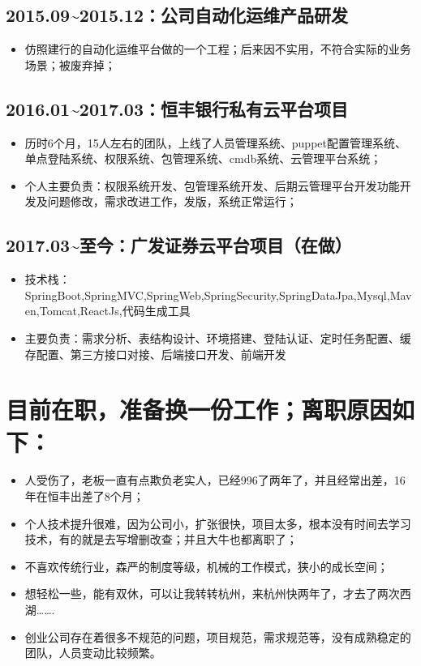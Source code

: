 \documentclass[11pt]{article}
\begin{document}
\subsection*{2015.09\textasciitilde{}2015.12：公司自动化运维产品研发}
\label{sec:orgheadline9}
\begin{itemize}
\item 仿照建行的自动化运维平台做的一个工程；后来因不实用，不符合实际的业务场景；被废弃掉；
\end{itemize}
\subsection*{2016.01\textasciitilde{}2017.03：恒丰银行私有云平台项目}
\label{sec:orgheadline10}
\begin{itemize}
\item 历时6个月，15人左右的团队，上线了人员管理系统、puppet配置管理系统、单点登陆系统、权限系统、包管理系统、cmdb系统、云管理平台系统；
\item 个人主要负责：权限系统开发、包管理系统开发、后期云管理平台开发功能开发及问题修改，需求改进工作，发版，系统正常运行；
\end{itemize}
\subsection*{2017.03\textasciitilde{}至今：广发证券云平台项目（在做）}
\label{sec:orgheadline11}
\begin{itemize}
\item 技术栈：SpringBoot,SpringMVC,SpringWeb,SpringSecurity,SpringDataJpa,Mysql,Maven,Tomcat,ReactJs,代码生成工具
\item 主要负责：需求分析、表结构设计、环境搭建、登陆认证、定时任务配置、缓存配置、第三方接口对接、后端接口开发、前端开发
\end{itemize}

\section*{目前在职，准备换一份工作；离职原因如下：}
\label{sec:orgheadline13}
\begin{itemize}
\item 人受伤了，老板一直有点欺负老实人，已经996了两年了，并且经常出差，16年在恒丰出差了8个月；
\item 个人技术提升很难，因为公司小，扩张很快，项目太多，根本没有时间去学习技术，有的就是去写增删改查；并且大牛也都离职了；
\item 不喜欢传统行业，森严的制度等级，机械的工作模式，狭小的成长空间；
\item 想轻松一些，能有双休，可以让我转转杭州，来杭州快两年了，才去了两次西湖\ldots{}\ldots{}.
\item 创业公司存在着很多不规范的问题，项目规范，需求规范等，没有成熟稳定的团队，人员变动比较频繁。
\end{itemize}
\end{document}
